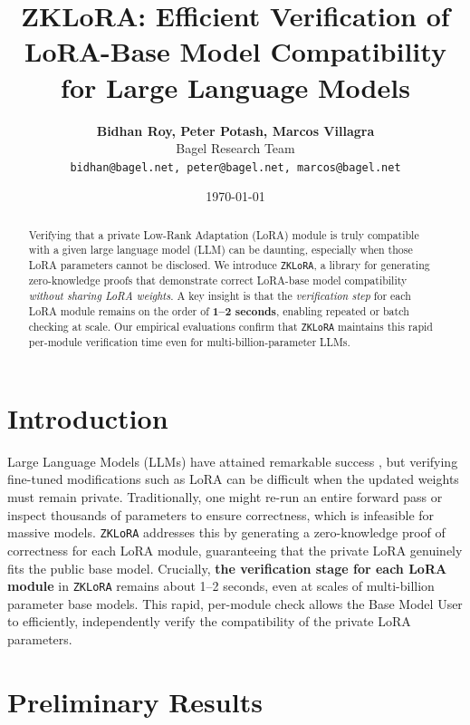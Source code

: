 \documentclass[11pt]{article}
\title{\textbf{ZKLoRA: Efficient Verification of LoRA-Base Model Compatibility for Large Language Models}}
\author{
    \textbf{Bidhan Roy, Peter Potash, Marcos Villagra} \\
    Bagel Research Team\footnotemark[1] \\
    \texttt{bidhan@bagel.net, peter@bagel.net, marcos@bagel.net}
}
\date{\today}
\begin{document}
\maketitle


\begin{abstract}
Verifying that a private Low-Rank Adaptation (LoRA) module is truly compatible with a given large language model (LLM) can be daunting, especially when those LoRA parameters cannot be disclosed. 
We introduce \texttt{ZKLoRA}, a library for generating zero-knowledge proofs that demonstrate correct LoRA-base model compatibility \emph{without sharing LoRA weights}. 
A key insight is that the \emph{verification step} for each LoRA module remains on the order of \textbf{1--2 seconds}, enabling repeated or batch checking at scale. 
Our empirical evaluations confirm that \texttt{ZKLoRA} maintains this rapid per-module verification time even for multi-billion-parameter LLMs.
\end{abstract}

\section{Introduction}
Large Language Models (LLMs) have attained remarkable success \cite{brown2020language, devlin2018bert}, but verifying fine-tuned modifications such as LoRA \cite{hu2021lora} can be difficult when the updated weights must remain private. 
Traditionally, one might re-run an entire forward pass or inspect thousands of parameters to ensure correctness, which is infeasible for massive models. 
\texttt{ZKLoRA} addresses this by generating a zero-knowledge proof of correctness for each LoRA module, guaranteeing that the private LoRA genuinely fits the public base model. 
Crucially, \textbf{the verification stage for each LoRA module} in \texttt{ZKLoRA} remains about 1--2 seconds, even at scales of multi-billion parameter base models. 
This rapid, per-module check allows the Base Model User to efficiently, independently verify the compatibility of the private LoRA parameters.

\section{Preliminary Results}
\end{document}
